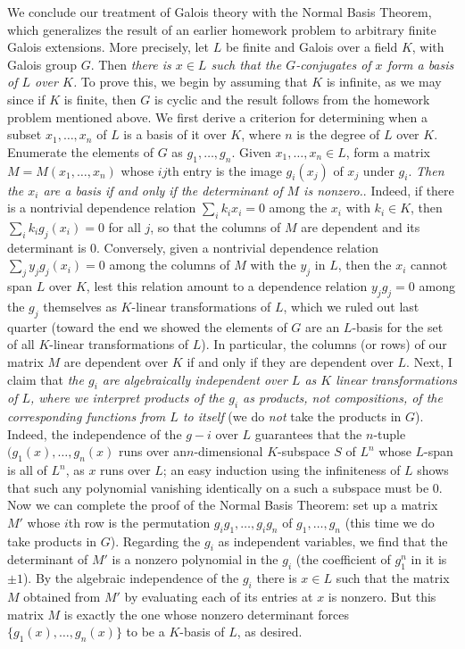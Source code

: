 We conclude our treatment of Galois theory with the Normal Basis Theorem, which generalizes the result of an earlier homework problem to arbitrary finite Galois extensions.  More precisely, let $L$ be finite and Galois over a field $K$, with Galois group $G$.  Then {\sl there is $x\in L$ such that the $G$-conjugates of $x$ form a basis of $L$ over $K$.}  To prove this, we begin by assuming that $K$ is infinite, as we may since if $K$ is finite, then $G$ is cyclic and the result follows from the homework problem mentioned above.  We first derive a criterion for determining when a subset $x_1,\ldots,x_n$ of $L$ is a basis of it over $K$, where $n$ is the degree of $L$ over $K$.  Enumerate the elements of $G$ as $g_1,\ldots,g_n$.  Given $x_1,\ldots,x_n\in L$, form a matrix $M =M(x_1,\ldots,x_n)$ whose $ij$th entry is the image $g_i(x_j)$ of $x_j$ under $g_i$.  {\sl Then the $x_i$ are a basis if and only if the determinant of $M$ is nonzero.}.  Indeed, if there is a nontrivial dependence relation $\sum_i k_i x_i = 0$ among the $x_i$ with $k_i\in K$, then
$\sum_i k_i g_j(x_i) = 0$ for all $j$, so that the columns of $M$ are dependent and its determinant is 0.  Conversely, given a nontrivial dependence relation $\sum_j y_j g_j(x_i) = 0$ among the columns of $M$ with the $y_j$ in $L$, then the $x_i$ cannot span $L$ over $K$, lest this relation amount to a dependence relation $y_j g_j = 0$ among the $g_j$ themselves as $K$-linear transformations of $L$, which we ruled out last quarter (toward the end we showed the elements of $G$ are an $L$-basis for the set of all $K$-linear transformations of $L$).  In particular, the columns (or rows) of our matrix $M$ are dependent over $K$ if and only if they are dependent over $L$.  Next, I claim that {\sl the $g_i$ are algebraically independent over $L$ as $K$ linear transformations of $L$, where we interpret products of the $g_i$ as products, not compositions, of the corresponding functions from $L$ to itself} (we do {\sl not} take the products in $G$).  Indeed, the independence of the $g-i$ over $L$ guarantees that the $n$-tuple $(g_1(x),\ldots,g_n(x)$ runs over an$n$-dimensional $K$-subspace $S$ of $L^n$ whose $L$-span is all of $L^n$, as $x$ runs over $L$; an easy induction using the infiniteness of $L$ shows that such any polynomial vanishing identically on a such a subspace must be 0.  Now we can complete the proof of the Normal Basis Theorem:  set up a matrix $M'$ whose $i$th row is the permutation $g_i g_1,\ldots,g_i g_n$ of $g_1,\ldots,g_n$ (this time we do take products in $G$).  Regarding the $g_i$ as independent variables, we find that the determinant of $M'$ is a nonzero polynomial in the $g_i$ (the coefficient of $g_1^n$ in it is $\pm 1$).  By the algebraic independence of the $g_i$ there is $x\in L$ such that the matrix $M$ obtained from $M'$ by evaluating each of its entries at $x$ is nonzero.  But this matrix $M$ is exactly the one whose nonzero determinant forces $\{g_1(x),\ldots,g_n(x)\}$ to be a $K$-basis of $L$, as desired.  

